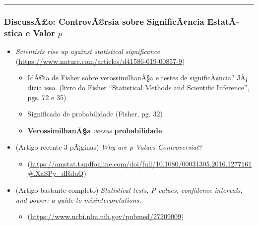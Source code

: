 \documentclass[]{article}
\providecommand{\tightlist}{%
  \setlength{\itemsep}{0pt}\setlength{\parskip}{0pt}}
\begin{document}
\begin{center}\rule{0.5\linewidth}{\linethickness}\end{center}

\subsubsection{\texorpdfstring{DiscussÃ£o: ControvÃ©rsia sobre
SignificÃ¢ncia EstatÃ­stica e Valor
\(p\)}{DiscussÃ£o: ControvÃ©rsia sobre SignificÃ¢ncia EstatÃ­stica e Valor p}}\label{discussao-controvarsia-sobre-significancia-estatastica-e-valor-p}

\begin{itemize}
\tightlist
\item
  \emph{Scientists rise up against statistical significance}
  (\url{https://www.nature.com/articles/d41586-019-00857-9})

  \begin{itemize}
  \tightlist
  \item
    IdÃ©ia de Fisher sobre verossimilhanÃ§a e testes de significÃ¢ncia?
    JÃ¡ dizia isso. (livro do Fisher ``Statistical Methods and
    Scientific Inference'', pgs. 72 e 35)\\
  \item
    Significado de probabilidade (Fisher, pg. 32)
  \item
    \textbf{VerossimilhanÃ§a} \emph{versus} \textbf{probabilidade}.
  \end{itemize}
\end{itemize}

\vspace{0.5cm}

\begin{itemize}
\tightlist
\item
  (Artigo recente 3 pÃ¡ginas) \emph{Why are p-Values Controversial?}

  \begin{itemize}
  \tightlist
  \item
    (\url{https://amstat.tandfonline.com/doi/full/10.1080/00031305.2016.1277161\#.XaSPy_dRduQ})
  \end{itemize}
\end{itemize}

\vspace{0.5cm}

\begin{itemize}
\tightlist
\item
  (Artigo bastante completo) \emph{Statistical tests, P values,
  confidence intervals, and power: a guide to misinterpretations.}

  \begin{itemize}
  \tightlist
  \item
    (\url{https://www.ncbi.nlm.nih.gov/pubmed/27209009})
  \end{itemize}
\end{itemize}
\end{document}
